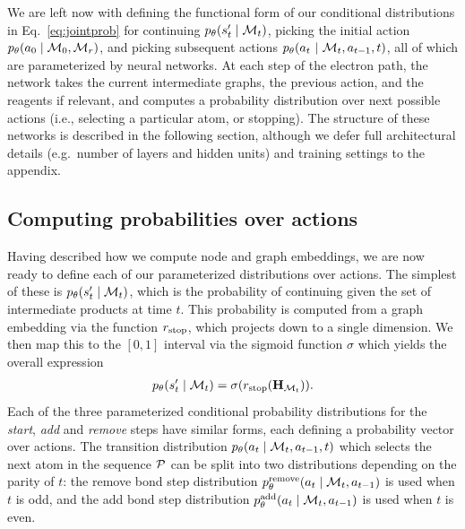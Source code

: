 We are left now with defining the functional form of our conditional distributions in  Eq.~\eqref{eq:jointprob} for continuing $p_\theta(s'_t \mid {\mathcal{M}}_t)$, picking the initial action $p_\theta(a_0 \mid {\mathcal{M}}_0, {\mathcal{M}}_r)$, and picking subsequent actions $p_\theta(a_t~|~{\mathcal{M}}_t, a_{t-1}, t)$, all of which are parameterized by neural networks.
At each step of the electron path, the network takes the current intermediate graphs, 
the previous action, and the reagents if relevant, 
and computes a probability distribution over next possible actions (i.e., selecting a particular atom, or stopping).
The structure of these networks is described in the following section, although we defer full architectural details (e.g.\ number of layers and hidden units) 
and training settings to the appendix.








\subsection{Computing probabilities over actions}

Having described how we compute node and graph embeddings, we are now ready to define each of our parameterized distributions over actions.
The simplest of these is $p_\theta(s'_t \mid {\mathcal{M}}_t)$, which is the probability of continuing given the set of intermediate products at time $t$. 
This probability is computed from a graph embedding via the function $r_{\textrm{stop}}$, which projects down to a single dimension. We then map this to the $[0,1]$ interval via the sigmoid function $\sigma$ which yields the overall expression
\begin{align}
p_\theta(s'_t \mid {\mathcal{M}}_t) = \sigma(r_{\textrm{stop}}({\mathbf{H}}_{{\mathcal{M}}_t})).
\end{align}
Each of the three parameterized conditional probability distributions for the {\em start}, {\em add} and {\em remove} steps have similar forms, each defining a probability vector over actions.
The transition distribution $p_\theta(a_t \mid  {\mathcal{M}}_t, a_{t-1}, t)$ 
which selects the next atom in the sequence ${\mathcal{P}}$
can be split into two distributions depending on the parity of $t$:
the remove bond step distribution $p_\theta^\textrm{remove}(a_t \mid  {\mathcal{M}}_t, a_{t-1})$ is used when $t$ is odd, 
and the add bond step distribution $p_\theta^\textrm{add}(a_t \mid {\mathcal{M}}_t, a_{t-1})$ is used when $t$ is even. 

